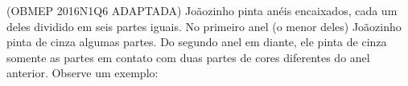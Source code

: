 \documentclass[preview]{standalone}
\begin{document}
\begin{center}
(OBMEP 2016N1Q6 ADAPTADA) Joãozinho pinta anéis encaixados, 
cada um deles dividido em seis partes iguais.
No primeiro anel (o menor deles) Joãozinho pinta de cinza algumas partes.
Do segundo anel em diante, ele pinta de cinza somente
as partes em contato com duas partes de cores diferentes do anel anterior.
Observe um exemplo:
\end{center}
\end{document}
